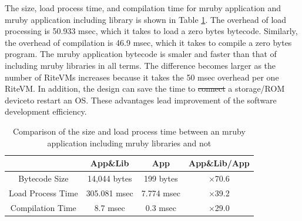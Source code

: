 \documentclass[conference,compsoc]{IEEEtran}
\providecommand{\DIFadd}[1]{{\protect\color{blue}\uwave{#1}}} %
\providecommand{\DIFdel}[1]{{\protect\color{red}\sout{#1}}}                      %
\providecommand{\DIFaddbegin}{} %
\providecommand{\DIFaddend}{} %
\providecommand{\DIFdelbegin}{} %
\providecommand{\DIFdelend}{} %
\begin{document}
The size, load process time, and compilation time for mruby application and mruby application including library is shown in Table \ref{tab:size_and_time}.
The overhead of load processing is 50.933 msec, which it takes to load a zero bytes bytecode.
Similarly, the overhead of compilation is 46.9 msec, which it takes to compile a zero bytes program.
The mruby application bytecode is smaler and faster than that of including mruby libraries in all terms.
The difference becomes larger as the number of RiteVMs increases because it takes the 50 msec overhead per one RiteVM. 
In addition, the design can save the time to \DIFdelbegin \DIFdel{connect }\DIFdelend \DIFaddbegin \DIFadd{rewrite }\DIFaddend a storage/ROM device\DIFaddbegin \DIFadd{, and }\DIFaddend to restart an OS.
These advantages lead improvement of the software development efficiency.

\begin{table}[t]
    \centering
    \caption{Comparison of the size and load process time between an mruby application including mruby libraries and not}
    \begin{tabular}{c||c|c|c}
                            & App\&Lib     & App        &   App\&Lib/App  \\ \hline
          Bytecode Size     & 14,044 bytes & 199 bytes  &   $\times$70.6          \\ %
          Load Process Time & 305.081 msec & 7.774 msec &   $\times$39.2          \\
          Compilation Time  & 8.7 msec     & 0.3 msec   &   $\times$29.0          \\
    \end{tabular}
    \label{tab:size_and_time}
\end{table}
\end{document}

